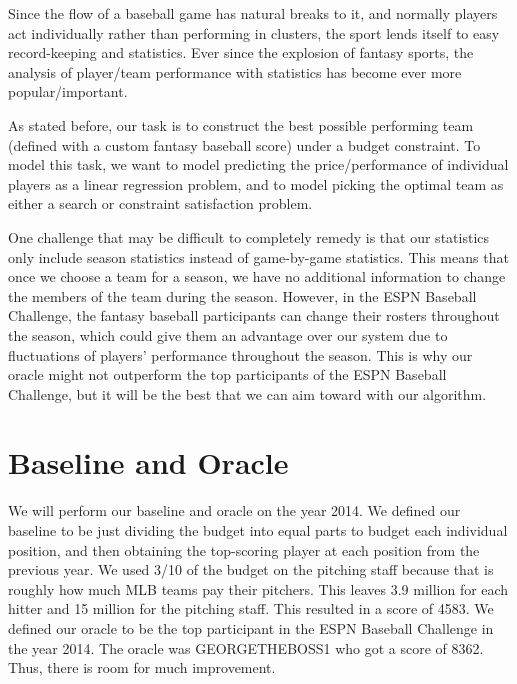 \documentclass[11pt]{amsart}
\begin{document}
Since the flow of a baseball game has natural breaks to it, and normally players act individually rather than performing in clusters, the sport lends itself to easy record-keeping and statistics. Ever since the explosion of fantasy sports, the analysis of player/team performance with statistics has become ever more popular/important. 

As stated before, our task is to construct the best possible performing team (defined with a custom fantasy baseball score) under a budget constraint. To model this task, we want to model predicting the price/performance of individual players as a linear regression problem, and to model picking the optimal team as either a search or constraint satisfaction problem.

One challenge that may be difficult to completely remedy is that our statistics only include season statistics instead of game-by-game statistics. This means that once we choose a team for a season, we have no additional information to change the members of the team during the season. However, in the ESPN Baseball Challenge, the fantasy baseball participants can change their rosters throughout the season, which could give them an advantage over our system due to fluctuations of players' performance throughout the season. This is why our oracle might not outperform the top participants of the ESPN Baseball Challenge, but it will be the best that we can aim toward with our algorithm.

\section{Baseline and Oracle}
We will perform our baseline and oracle on the year 2014. We defined our baseline to be just dividing the budget into equal parts to budget each individual position, and then obtaining the top-scoring player at each position from the previous year. We used 3/10 of the budget on the pitching staff because that is roughly how much MLB teams pay their pitchers. This leaves 3.9 million for each hitter and 15 million for the pitching staff. This resulted in a score of 4583. We defined our oracle to be the top participant in the ESPN Baseball Challenge in the year 2014. The oracle was GEORGETHEBOSS1 who got a score of 8362. Thus, there is room for much improvement.
\end{document}
